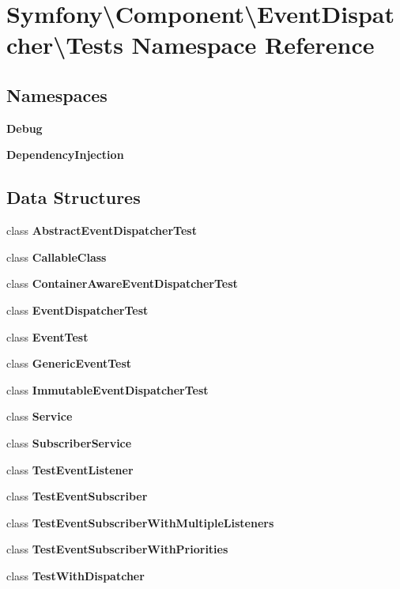 \section{Symfony\textbackslash{}Component\textbackslash{}Event\+Dispatcher\textbackslash{}Tests Namespace Reference}
\label{namespace_symfony_1_1_component_1_1_event_dispatcher_1_1_tests}
\subsection*{Namespaces}
\begin{DoxyCompactItemize}
\item 
 {\bf Debug}
\item 
 {\bf Dependency\+Injection}
\end{DoxyCompactItemize}
\subsection*{Data Structures}
\begin{DoxyCompactItemize}
\item 
class {\bf Abstract\+Event\+Dispatcher\+Test}
\item 
class {\bf Callable\+Class}
\item 
class {\bf Container\+Aware\+Event\+Dispatcher\+Test}
\item 
class {\bf Event\+Dispatcher\+Test}
\item 
class {\bf Event\+Test}
\item 
class {\bf Generic\+Event\+Test}
\item 
class {\bf Immutable\+Event\+Dispatcher\+Test}
\item 
class {\bf Service}
\item 
class {\bf Subscriber\+Service}
\item 
class {\bf Test\+Event\+Listener}
\item 
class {\bf Test\+Event\+Subscriber}
\item 
class {\bf Test\+Event\+Subscriber\+With\+Multiple\+Listeners}
\item 
class {\bf Test\+Event\+Subscriber\+With\+Priorities}
\item 
class {\bf Test\+With\+Dispatcher}
\end{DoxyCompactItemize}
